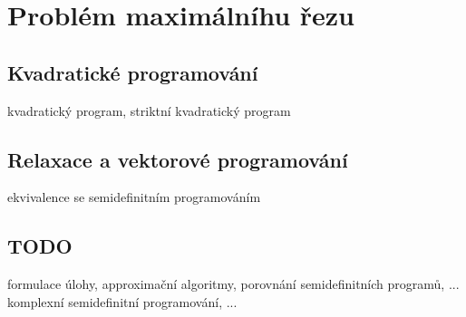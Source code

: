 \chapter{Problém maximálníhu řezu}

\section{Kvadratické programování}

kvadratický program, striktní kvadratický program

\section{Relaxace a vektorové programování}

ekvivalence se semidefinitním programováním

\section*{TODO}

formulace úlohy, approximační algoritmy, porovnání semidefinitních programů, ...
komplexní semidefinitní programování, ...
